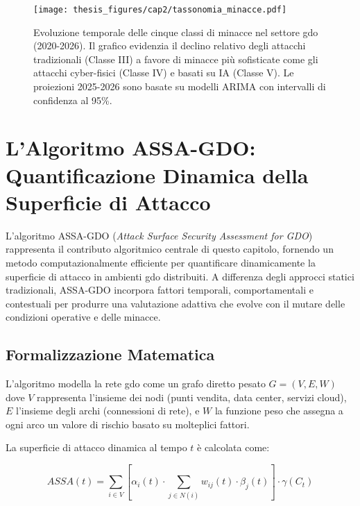 \begin{figure}[htbp]
\centering
\texttt{[image: thesis\_figures/cap2/tassonomia\_minacce.pdf]}
\caption[Evoluzione temporale delle classi di minacce nel settore GDO]{Evoluzione temporale delle cinque classi di minacce nel settore \gls{gdo} (2020-2026). Il grafico evidenzia il declino relativo degli attacchi tradizionali (Classe III) a favore di minacce più sofisticate come gli attacchi cyber-fisici (Classe IV) e basati su IA (Classe V). Le proiezioni 2025-2026 sono basate su modelli ARIMA con intervalli di confidenza al 95\%.}
\label{fig:tassonomia_minacce}
\end{figure}

\section{\texorpdfstring{L'Algoritmo ASSA-GDO: Quantificazione Dinamica della Superficie di Attacco}{2.4 - L'Algoritmo ASSA-GDO: Quantificazione Dinamica della Superficie di Attacco}}
\label{sec:algoritmo_assa}

L'algoritmo ASSA-GDO (\textit{Attack Surface Security Assessment for GDO}) rappresenta il contributo algoritmico centrale di questo capitolo, fornendo un metodo computazionalmente efficiente per quantificare dinamicamente la superficie di attacco in ambienti \gls{gdo} distribuiti. A differenza degli approcci statici tradizionali, ASSA-GDO incorpora fattori temporali, comportamentali e contestuali per produrre una valutazione adattiva che evolve con il mutare delle condizioni operative e delle minacce.

\subsection{\texorpdfstring{Formalizzazione Matematica}{2.4.1 - Formalizzazione Matematica}}

L'algoritmo modella la rete \gls{gdo} come un grafo diretto pesato $G = (V, E, W)$ dove $V$ rappresenta l'insieme dei nodi (punti vendita, data center, servizi cloud), $E$ l'insieme degli archi (connessioni di rete), e $W$ la funzione peso che assegna a ogni arco un valore di rischio basato su molteplici fattori.

La superficie di attacco dinamica al tempo $t$ è calcolata come:

\begin{equation}
ASSA(t) = \sum_{i \in V} \left[ \alpha_i(t) \cdot \sum_{j \in N(i)} w_{ij}(t) \cdot \beta_j(t) \right] \cdot \gamma(C_t)
\label{eq:assa_formula}
\end{equation}

